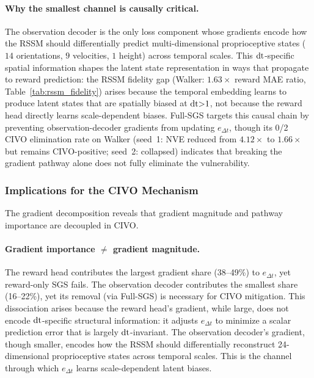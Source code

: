 \paragraph{Why the smallest channel is causally critical.} The observation decoder is the only loss component whose gradients encode how the RSSM should differentially predict multi-dimensional proprioceptive states ($14$ orientations, $9$ velocities, $1$ height) across temporal scales.  This $\mathrm{dt}$-specific spatial information shapes the latent state representation in ways that propagate to reward prediction: the RSSM fidelity gap (Walker: $1.63\times$ reward MAE ratio, Table~\ref{tab:rssm_fidelity}) arises because the temporal embedding learns to produce latent states that are spatially biased at $\mathrm{dt}{>}1$, not because the reward head directly learns scale-dependent biases.  Full-SGS targets this causal chain by preventing observation-decoder gradients from updating $e_{\Delta t}$, though its 0/2 CIVO elimination rate on Walker (seed~1: NVE reduced from $4.12\times$ to $1.66\times$ but remains CIVO-positive; seed~2: collapsed) indicates that breaking the gradient pathway alone does not fully eliminate the vulnerability.

\subsubsection{Implications for the CIVO Mechanism}
\label{sec:sgs_implications}

The gradient decomposition reveals that gradient magnitude and pathway importance are decoupled in CIVO.

\paragraph{Gradient importance $\neq$ gradient magnitude.} The reward head contributes the largest gradient share (38--49\%) to $e_{\Delta t}$, yet reward-only SGS fails.  The observation decoder contributes the smallest share (16--22\%), yet its removal (via Full-SGS) is necessary for CIVO mitigation.  This dissociation arises because the reward head's gradient, while large, does not encode $\mathrm{dt}$-specific structural information: it adjusts $e_{\Delta t}$ to minimize a scalar prediction error that is largely $\mathrm{dt}$-invariant.  The observation decoder's gradient, though smaller, encodes how the RSSM should differentially reconstruct 24-dimensional proprioceptive states across temporal scales. This is the channel through which $e_{\Delta t}$ learns scale-dependent latent biases.

